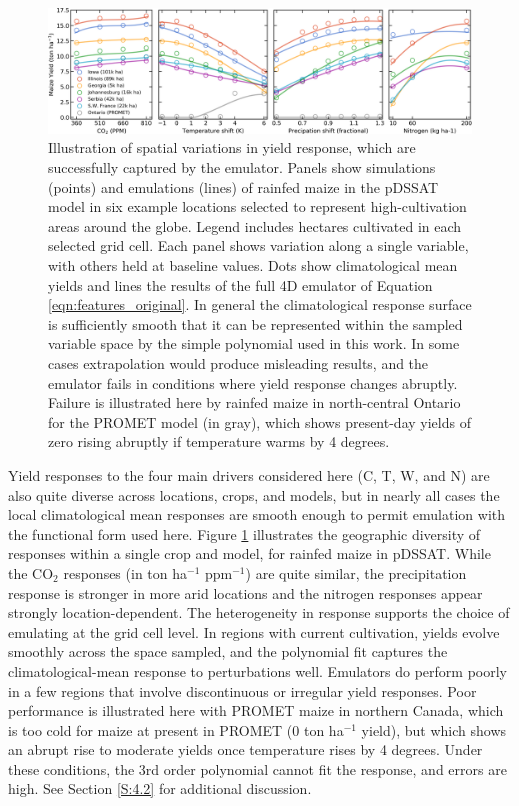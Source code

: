 \documentclass[gmdd]{copernicus} %
\begin{document}
\begin{figure}[ht]
\centering
    \includegraphics[width=16.3cm]{figures/regression_example.png}
    \caption{
    Illustration of spatial variations in yield response, which are successfully captured by the emulator. 
    Panels show simulations (points) and emulations (lines) of rainfed maize in the pDSSAT model in six example locations selected to represent high-cultivation areas around the globe. 
    Legend includes hectares cultivated in each selected grid cell. 
    Each panel shows variation along a single variable, with others held at baseline values. 
    Dots show climatological mean yields and lines the results of the full 4D emulator of Equation \ref{eqn:features_original}. 
    In general the climatological response surface is sufficiently smooth that it can be represented within the sampled variable space by the simple polynomial used in this work. 
    In some cases extrapolation would produce misleading results, and the emulator fails in conditions where yield response changes abruptly. 
    Failure is illustrated here by rainfed maize in north-central Ontario for the PROMET model (in gray), which shows present-day yields of zero rising abruptly if temperature warms by 4 degrees.
    }
   \label{fig:regression}
\end{figure}

Yield responses to the four main drivers considered here (C, T, W, and N) are also quite diverse across locations, crops, and models, but in nearly all cases the local climatological mean responses are smooth enough to permit emulation with the functional form used here.
Figure \ref{fig:regression} illustrates the geographic diversity of responses within a single crop and model, for rainfed maize in pDSSAT. 
While the CO$_2$ responses (in ton ha$^{-1}$ ppm$^{-1}$) are quite similar, the  precipitation response is stronger in more arid locations and the nitrogen responses appear strongly location-dependent. 
The heterogeneity in response supports the choice of emulating at the grid cell level. 
In regions with current cultivation, yields evolve smoothly across the space sampled, and the polynomial fit captures the climatological-mean response to perturbations well. 
Emulators do perform poorly in a few regions that involve discontinuous or irregular yield responses. 
Poor performance is illustrated here with PROMET maize in northern Canada, which is too cold for maize at present in PROMET (0 ton ha$^{-1}$ yield), but which shows an abrupt rise to moderate yields once temperature rises by 4 degrees.
Under these conditions, the 3rd order polynomial cannot fit the response, and errors are high. See Section \ref{S:4.2} for additional discussion. 
\end{document}

